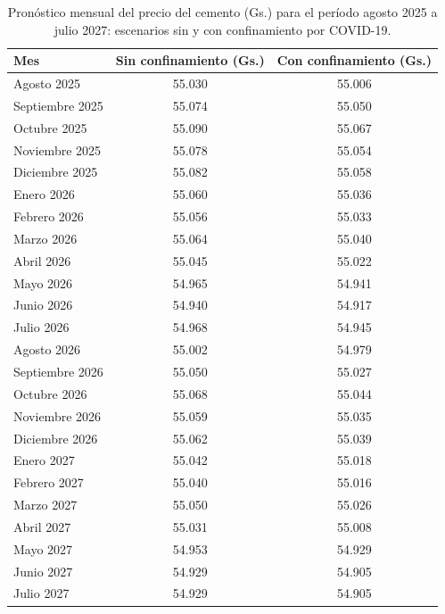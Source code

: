 \begin{table}[H]
    \centering
    \caption{Pronóstico mensual del precio del cemento (Gs.) para el período agosto 2025 a julio 2027: escenarios sin y con confinamiento por COVID-19.}
    \label{tab:sarimax_pronostico}
    \begin{tabular}{lcc}
        \toprule
        \textbf{Mes} & \textbf{Sin confinamiento (Gs.)} & \textbf{Con confinamiento (Gs.)} \\
        \midrule
        Agosto 2025      & 55.030 & 55.006 \\
        Septiembre 2025  & 55.074 & 55.050 \\
        Octubre 2025     & 55.090 & 55.067 \\
        Noviembre 2025   & 55.078 & 55.054 \\
        Diciembre 2025   & 55.082 & 55.058 \\
        Enero 2026       & 55.060 & 55.036 \\
        Febrero 2026     & 55.056 & 55.033 \\
        Marzo 2026       & 55.064 & 55.040 \\
        Abril 2026       & 55.045 & 55.022 \\
        Mayo 2026        & 54.965 & 54.941 \\
        Junio 2026       & 54.940 & 54.917 \\
        Julio 2026       & 54.968 & 54.945 \\
        Agosto 2026      & 55.002 & 54.979 \\
        Septiembre 2026  & 55.050 & 55.027 \\
        Octubre 2026     & 55.068 & 55.044 \\
        Noviembre 2026   & 55.059 & 55.035 \\
        Diciembre 2026   & 55.062 & 55.039 \\
        Enero 2027       & 55.042 & 55.018 \\
        Febrero 2027     & 55.040 & 55.016 \\
        Marzo 2027       & 55.050 & 55.026 \\
        Abril 2027       & 55.031 & 55.008 \\
        Mayo 2027        & 54.953 & 54.929 \\
        Junio 2027       & 54.929 & 54.905 \\
        Julio 2027       & 54.929 & 54.905 \\
        \bottomrule
    \end{tabular}
\end{table}

